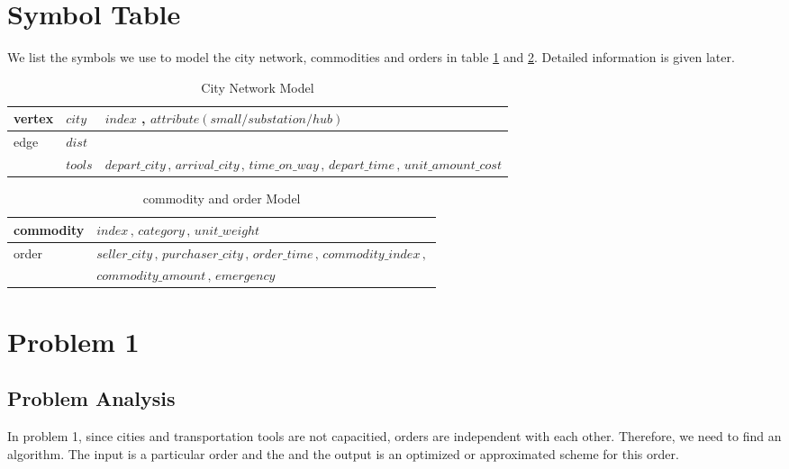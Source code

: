 \documentclass[11pt, a4paper]{article} %
\begin{document}
\section{Symbol Table}
	We list the symbols we use to model the city network, commodities and orders in table \ref{tb:1} and \ref{tb:2}. Detailed information is given later.
	\begin{table}[H]
	\centering
	\begin{tabular}{|l|l|l|}
	\hline
	vertex & $city$ & $index$ , $attribute(small/substation/hub)$\\
	\hline
	edge & $dist$ & \\ \cline{2-2} \cline{2-3}
	& $tools$ & $	depart\_city\,,\, arrival\_city\,,\, time\_on\_way\,,\, depart\_time\,,\, unit\_amount\_cost$\\
	\hline
	\end{tabular}
	\caption{City Network Model}
	\label{tb:1}
	\end{table}
	\begin{table}[H]
	\centering
	\begin{tabular}{|l|l|}
		\hline
		commodity & $index\,,\, category\,,\, unit\_weight$\\
		\hline
		order & 	$
		seller\_city\,,\, purchaser\_city\,,\, order\_time\,,\, commodity\_index\,,\,
		$\\
		&$ commodity\_amount\,,\,emergency$ \\
		\hline
	\end{tabular}
	\caption{commodity and order Model}
	\label{tb:2}
	\end{table}
\section{Problem 1}

	\subsection{Problem Analysis}
	In problem 1, since cities and transportation tools are not capacitied, orders are independent with each other. Therefore, we need to find an algorithm. The input is a particular order and the and the output is an optimized or approximated scheme for this order.
\end{document}
